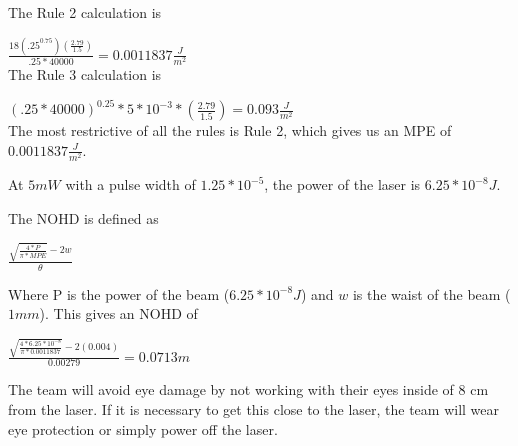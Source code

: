 \documentclass[openbib,letterpaper,10pt]{article}
\begin{document}
\begin{spacing}{1.15}
The Rule 2 calculation is

{\large $\frac{18(.25^{0.75})(\frac{2.79}{1.5})}{.25*40000} = 0.0011837 \frac{J}{m^2}$ }\\

The Rule 3 calculation is

{\large $(.25*40000)^{0.25} * 5*10^{-3}*(\frac{2.79}{1.5}) = 0.093 \frac{J}{m^2}$ }\\

The most restrictive of all the rules is Rule 2, which gives us an MPE of $0.0011837 \frac{J}{m^2}$.

At $5mW$ with a pulse width of $1.25*10^{-5}$, the power of the laser is $6.25*10^{-8} J$. 

The NOHD is defined as

{\LARGE $ \frac{\sqrt{\frac{4 * P}{\pi * MPE}} - 2w}{\theta}$}

Where P is the power of the beam ($6.25*10^{-8} J$) and $w$ is the waist of the beam ($1mm$). This gives an NOHD of 

{\Large$ \frac{\sqrt{\frac{4 * 6.25*10^{-8}}{\pi * 0.0011837}} - 2(0.004)}{0.00279} = 0.0713 m $}
	
The team will avoid eye damage by not working with their eyes inside of 8 cm from the laser. If it is necessary to get this close to the laser, the team will wear eye protection or simply power off the laser. 

\clearpage


\clearpage
\end{spacing}
\end{document}
